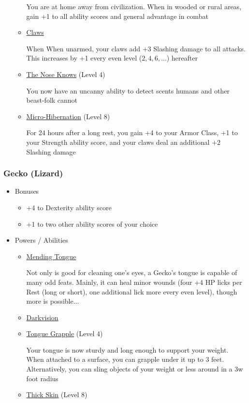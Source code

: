 \documentclass[12pt, landscape]{article}
\begin{document}
\begin{FlushLeft}
\begin{multicols}{2}
\begin{itemize}
\begin{itemize}
					You are at home away from civilization. When in wooded or rural areas, gain +1 to all ability scores and general advantage in combat
					\item \underline{Claws}

					When When unarmed, your claws add +3 Slashing damage to all attacks. This increases by +1 every even level ($2, 4, 6, \dots$) hereafter

					\item \underline{The Nose Knows} (Level 4)

					You now have an uncanny ability to detect scents humans and other beast-folk cannot
					\item \underline{Micro-Hibernation} (Level 8)

					For 24 hours after a long rest, you gain +4 to your Armor Class, +1 to your Strength ability score, and your claws deal an additional +2 Slashing damage
				\end{itemize}
			\end{itemize}
			\vfill \null \columnbreak

			\subsubsection{Gecko (Lizard)}
			\begin{itemize}
				\item Bonuses
				\begin{itemize}
					\item +4 to Dexterity ability score
					\item +1 to two other ability scores of your choice
				\end{itemize}
				\item Powers / Abilities
				\begin{itemize}
					\item \underline{Mending Tongue}

					Not only is good for cleaning one's eyes, a Gecko’s tongue is capable of many odd feats. Mainly, it can heal minor wounds (four +4 HP licks per Rest (long or short), one additional lick more every even level), though more is possible$\dots$
					\item \underline{Darkvision}
					\item \underline{Tongue Grapple} (Level 4)

					Your tongue is now sturdy and long enough to support your weight. When attached to a surface, you can grapple under it up to 3 feet. Alternatively, you can sling objects of your weight or less around in a 3w foot radius
					\item \underline{Thick Skin} (Level 8)


\end{itemize}
\end{itemize}
\end{multicols}
\end{FlushLeft}
\end{document}
